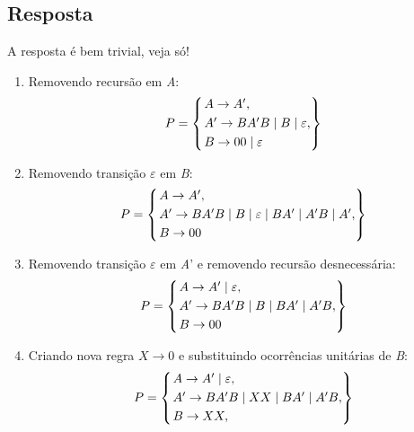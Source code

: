 \documentclass[11pt,portuguese]{fphw}
\begin{document}
			\subsection*{Resposta}
				A resposta é bem trivial, veja só!
				\newcommand{\barra}{\mid}
				\begin{enumerate}
					\item Removendo recursão em \textit{A}:
					$$
						P = \begin{dcases}
						\begin{rcases}
							A \rightarrow A',\\
							A' \rightarrow BA'B \barra B \barra \varepsilon,\\
							B \rightarrow 00 \mid \varepsilon
							\end{rcases}
						\end{dcases}
					$$
					\item Removendo transição $\varepsilon$ em 								\textit{B}:
						$$
						P = \begin{dcases}
						\begin{rcases}
							A \rightarrow A',\\
							A' \rightarrow BA'B \barra B \barra \varepsilon
							 \barra BA' \barra A'B \barra A',\\
							B \rightarrow 00
							\end{rcases}
						\end{dcases}
					$$
					\newpage
					\item Removendo transição $\varepsilon$ em
						\textit{A}' e removendo recursão desnecessária:
						$$
						P = \begin{dcases}
						\begin{rcases}
							A \rightarrow A' \barra \varepsilon,\\
							A' \rightarrow BA'B \barra B 
							 \barra BA' \barra A'B,\\
							B \rightarrow 00
							\end{rcases}
						\end{dcases}
						$$
					\item Criando nova regra $ X \rightarrow 0$
					e substituindo ocorrências unitárias de \textit{B}:
						$$
						P = \begin{dcases}
						\begin{rcases}
							A \rightarrow A' \barra \varepsilon,\\
							A' \rightarrow BA'B \barra XX 
							 \barra BA' \barra A'B,\\
							B \rightarrow XX,\\

\end{rcases}
\end{dcases}$$
\end{enumerate}
\end{document}
